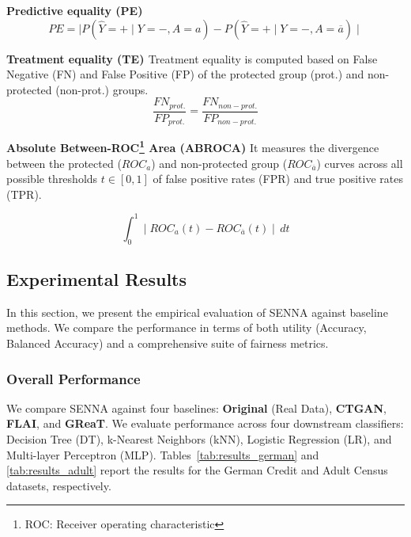 \documentclass[runningheads]{llncs}
\begin{document}
\textbf{Predictive equality (PE)}
\label{eq:predictive_equality}
\begin{equation}
PE = \mid P(\hat{Y} = + \mid Y = -,A = a) - P(\hat{Y} = + \mid Y = -,A = \overline{a})\mid
\end{equation}

\textbf{Treatment equality (TE) \cite{berk2021fairness}} Treatment equality is computed based on False Negative (FN) and False Positive (FP) of the protected group (prot.) and non-protected (non-prot.) groups.
\begin{equation}
\label{eq:treatment_equality}
    \frac{FN_{prot.}}{FP_{prot.}} = \frac{FN_{non-prot.}}{FP_{non-prot.}}
\end{equation}

\textbf{Absolute Between-ROC\footnote{ROC: Receiver operating characteristic} Area (ABROCA)}
It measures the divergence between the protected ($ROC_a$) and non-protected group ($ROC_{\overline{a}}$) curves across all possible thresholds $t \in [0, 1]$ of false positive rates (FPR) and true positive rates (TPR).

\begin{equation}
\label{eq:abroca}
    \int_{0}^{1}\mid ROC_{a}(t) - ROC_{\overline{a}}(t)\mid \,dt
\end{equation}

\subsection{Experimental Results}
\label{sec:results}

In this section, we present the empirical evaluation of SENNA against baseline methods. We compare the performance in terms of both utility (Accuracy, Balanced Accuracy) and a comprehensive suite of fairness metrics.

\subsubsection{Overall Performance}
We compare SENNA against four baselines: \textbf{Original} (Real Data), \textbf{CTGAN}, \textbf{FLAI}, and \textbf{GReaT}. We evaluate performance across four downstream classifiers: Decision Tree (DT), k-Nearest Neighbors (kNN), Logistic Regression (LR), and Multi-layer Perceptron (MLP). Tables~\ref{tab:results_german} and \ref{tab:results_adult} report the results for the German Credit and Adult Census datasets, respectively.
\end{document}
